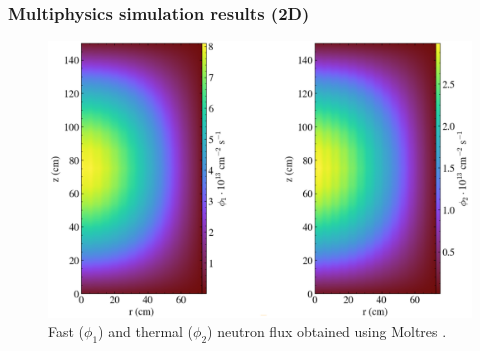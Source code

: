 \begin{frame}
  \frametitle{Multiphysics simulation results (2D)}
  \begin{figure}
   \vspace{-0.1in}
   \includegraphics[height=0.85\textheight]{./images/moltres_flux.png}
   \vspace{-0.1in}
   \caption{Fast ($\phi_1$) and thermal ($\phi_2$) neutron flux obtained using Moltres 			\cite{lindsay_introduction_2018}.}
    \end{figure}
\end{frame}

